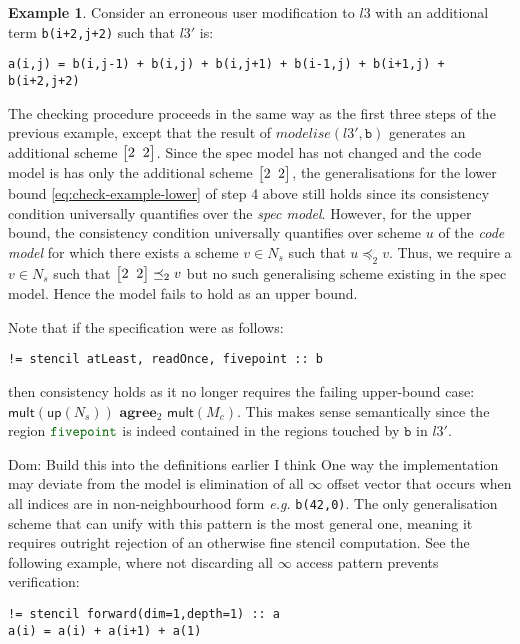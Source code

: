 \documentclass[10pt,preprint]{sigplanconf}
\newcommand{\dnote}[1]{\textcolor{darkpurple}{Dom: #1}}
\newcounter{block}
\theoremstyle{definition}
\newtheorem{example}[block]{Example}
\newcommand{\eg}{\emph{e.g.}}
\newcommand{\vtwoh}[2]{\setlength{\arraycolsep}{0em}
\left[\begin{array}{cc}#1 \; & \; #2\end{array}\right]}
\newcommand{\consAName}{\textbf{agree}}
\newcommand{\consSub}[3]{#2 \,\, \consAName{}_{#1} \,\,#3}
\begin{document}
\begin{example}
Consider an erroneous user modification to $l3$ with an
additional term \texttt{b(i+2,j+2)} such that $l3'$ is:
%
\begin{verbatim}
a(i,j) = b(i,j-1) + b(i,j) + b(i,j+1) + b(i-1,j) + b(i+1,j) + b(i+2,j+2)
\end{verbatim}
%
The checking procedure proceeds in the same way as the first three
steps of the previous example, except that the result of
$\mathit{modelise}(l3',\texttt{b})$ generates an additional scheme
$\vtwoh{2}{2}$. Since the spec model has not changed and the code
model is has only the additional scheme $\vtwoh{2}{2}$, the generalisations for
the lower bound \eqref{eq:check-example-lower}
of step 4 above still holds since its consistency condition
universally quantifies over the \emph{spec model}. However, for
the upper bound, the consistency condition universally quantifies
over scheme $u$ of the \emph{code model} for which there exists
a scheme $v \in N_s$ such that $u \preceq_2 v$. Thus, we require a $v
\in N_s$ such that $\vtwoh{2}{2} \preceq_2 v$ but no such generalising
scheme existing in the spec model. Hence the model fails to hold as an upper bound.

Note that if the specification were as follows:
%
\begin{verbatim}
!= stencil atLeast, readOnce, fivepoint :: b
\end{verbatim}
%
then consistency holds as it no longer requires the failing upper-bound case:
$\consSub{2}{\textsf{mult}(\textsf{up}(N_s))}{\textsf{mult}(M_c)}$.
 This makes sense semantically since the region ${\textcolor{darkgreen}{\texttt{fivepoint}}}$
is indeed contained in the regions touched by $\texttt{b}$ in $l3'$.
\end{example}

\dnote{Build this into the definitions earlier I think}
One way the implementation may deviate from the model is elimination of all $\infty$
offset vector that occurs when all indices are in non-neighbourhood form \eg{}
\texttt{b(42,0)}. The only generalisation scheme that can unify
with this pattern is the most general one, meaning it requires outright
rejection of an otherwise fine stencil computation. See the following example,
where not discarding all $\infty$ access pattern prevents verification:
%
\begin{verbatim}
!= stencil forward(dim=1,depth=1) :: a
a(i) = a(i) + a(i+1) + a(1)
\end{verbatim}
\end{document}
